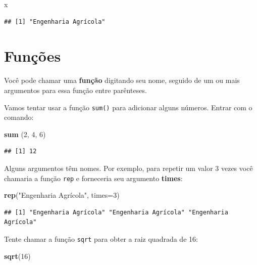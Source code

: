 \documentclass[
]{book}
\newenvironment{Shaded}{\begin{snugshade}}{\end{snugshade}}
\newcommand{\DataTypeTok}[1]{\textcolor[rgb]{0.13,0.29,0.53}{#1}}
\newcommand{\DecValTok}[1]{\textcolor[rgb]{0.00,0.00,0.81}{#1}}
\newcommand{\KeywordTok}[1]{\textcolor[rgb]{0.13,0.29,0.53}{\textbf{#1}}}
\newcommand{\NormalTok}[1]{#1}
\newcommand{\StringTok}[1]{\textcolor[rgb]{0.31,0.60,0.02}{#1}}
\begin{document}
\begin{Shaded}
\begin{Highlighting}[]
\NormalTok{x}
\end{Highlighting}
\end{Shaded}

\begin{verbatim}
## [1] "Engenharia Agrícola"
\end{verbatim}

\hypertarget{funuxe7uxf5es}{%
\section{Funções}\label{funuxe7uxf5es}}

Você pode chamar uma \textbf{função} digitando seu nome, seguido de um ou mais argumentos para essa função entre parênteses.

Vamos tentar usar a função \texttt{sum()} para adicionar alguns números. Entrar com o comando:

\begin{Shaded}
\begin{Highlighting}[]
\KeywordTok{sum}\NormalTok{ (}\DecValTok{2}\NormalTok{, }\DecValTok{4}\NormalTok{, }\DecValTok{6}\NormalTok{)}
\end{Highlighting}
\end{Shaded}

\begin{verbatim}
## [1] 12
\end{verbatim}

Alguns argumentos têm nomes. Por exemplo, para repetir um valor 3 vezes você chamaria a função \texttt{rep} e forneceria seu argumento \textbf{times}:

\begin{Shaded}
\begin{Highlighting}[]
\KeywordTok{rep}\NormalTok{(}\StringTok{"Engenharia Agrícola"}\NormalTok{, }\DataTypeTok{times=}\DecValTok{3}\NormalTok{)}
\end{Highlighting}
\end{Shaded}

\begin{verbatim}
## [1] "Engenharia Agrícola" "Engenharia Agrícola" "Engenharia Agrícola"
\end{verbatim}

Tente chamar a função \texttt{sqrt} para obter a raiz quadrada de 16:

\begin{Shaded}
\begin{Highlighting}[]
\KeywordTok{sqrt}\NormalTok{(}\DecValTok{16}\NormalTok{)}
\end{Highlighting}
\end{Shaded}
\end{document}
